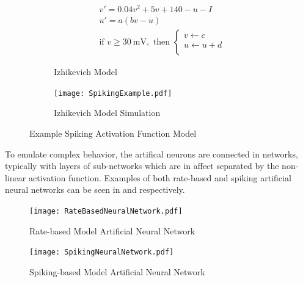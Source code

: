 \begin{figure}
\centering
\captionsetup{justification=centering}
\vspace{0.5cm}
\begin{subfigure}{.9\textwidth}
  \centering
  \begin{equation}
  \begin{split}
  &v' = 0.04v^2+5v + 140 - u - I\\
  &u' = a(bv-u)  \\
  &\text{if } v\ge  \SI{30}{\mV}, \text{ then } 
  \begin{cases}
      v \leftarrow c\\           
      u \leftarrow u+d\\           
  \end{cases} \nonumber
  \end{split}
  \end{equation}
    \caption{Izhikevich Model}
    \label{fig:Izhikevich Model}
  \end{subfigure}
\begin{subfigure}{.7\textwidth}
  \centering
  \mbox{\texttt{[image: SpikingExample.pdf]}}
  \captionsetup{justification=centering, skip=3pt}
  \caption{Izhikevich \cite{Iz2005} Model Simulation}
  \label{fig:spiking example}
\end{subfigure}
\caption{Example Spiking Activation Function Model}
\label{fig:Example Spiking Model}
\end{figure}

To emulate complex behavior, the artifical neurons are connected in networks, typically with layers of sub-networks which are in affect separated by the non-linear activation function.
Examples of both rate-based and spiking artificial neural networks can be seen in  and  respectively.



\begin{figure}[!t]
\centering
\captionsetup{justification=centering}
\captionsetup{width=.9\linewidth}
\centerline{
\mbox{\texttt{[image: RateBasedNeuralNetwork.pdf]}}
}
\caption{Rate-based Model Artificial Neural Network}
\label{fig:Rate-based Model Network}
\end{figure}

\begin{figure}[!t]
\centering
\captionsetup{justification=centering}
\captionsetup{width=.9\linewidth}
\centerline{
\mbox{\texttt{[image: SpikingNeuralNetwork.pdf]}}
}
\caption{Spiking-based Model Artificial Neural Network}
\label{fig:Spiking Model Network}
\end{figure}

